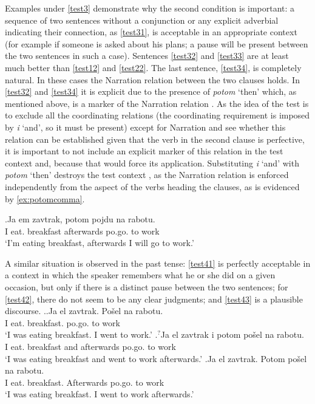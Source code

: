 Examples under \ref{test3} demonstrate why the second condition is important: a sequence of two sentences without a conjunction  or any explicit adverbial indicating their connection, as \ref{test31}, is acceptable in an appropriate context   (for example if someone is asked about his plans; a pause will be present between the two sentences in such a case). Sentences \ref{test32} and \ref{test33} are at least much better than \ref{test12} and \ref{test22}. The last sentence, \ref{test34}, is completely natural. In these cases the Narration relation  between the two clauses holds. In \ref{test32} and \ref{test34} it is explicit due to the presence of \textit{potom} `then' which, as mentioned above, is a marker of the Narration relation . As the idea of the test is to exclude all the coordinating relations (the coordinating requirement is imposed by \textit{i} `and', so it must be present) except for Narration and see whether this relation can be established given that the verb in the second clause is perfective, it is important to not include an explicit marker of this relation in the test context   and, because that would force its application. Substituting  \textit{i} `and' with \textit{potom} `then' destroys the test context  , as the Narration relation  is enforced independently from the aspect of the verbs heading the clauses, as is evidenced by \ref{ex:potomcomma}.

\exg.\label{ex:potomcomma}Ja em\textsuperscript{\IPF} zavtrak, potom pojdu\textsuperscript{\PF} na rabotu.\\
I eat. breakfast afterwards po.go. to work\\
\trans `I'm eating breakfast, afterwards I will go to work.'

A similar situation is observed in the past  tense: \ref{test41} is perfectly acceptable in a context   in which the speaker remembers what he or she did on a given occasion, but only if there is a distinct pause between the two sentences; for \ref{test42}, there do not seem to be any clear judgments; and \ref{test43} is a plausible discourse.
\ex.\label{test4}\ag.\label{test41}Ja el\textsuperscript{\IPF} zavtrak. Po\v{s}el\textsuperscript{\PF} na rabotu.\\
I eat. breakfast. po.go. to work\\
\trans `I was eating breakfast. I went to work.'
\bg.\label{test42}$^?$Ja el\textsuperscript{\IPF} zavtrak i potom po\v{s}el\textsuperscript{\PF} na rabotu.\\
I eat. breakfast and afterwards po.go. to work\\
\trans `I was eating breakfast and went to work afterwards.'
\bg.\label{test43}Ja el\textsuperscript{\IPF} zavtrak. Potom po\v{s}el\textsuperscript{\PF} na rabotu.\\
I eat. breakfast. Afterwards po.go. to work\\
\trans `I was eating breakfast. I went to work afterwards.'

